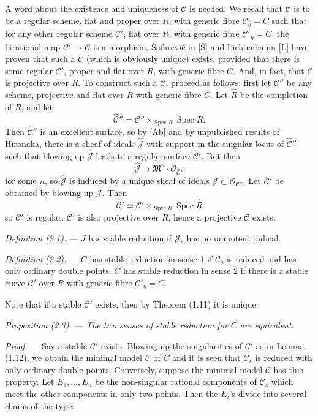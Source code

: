\documentclass[10pt]{article}
\newcommand{\Spec}{\operatorname{Spec}}
\newcommand{\cO}{\mathcal O}
\begin{document}
A word about the existence and uniqueness of $\mathscr C$ is needed. We recall that $\mathscr C$ is to be a regular scheme, flat and proper over $R$, with generic fibre $\mathscr C_\eta=C$ such that for any other regular scheme $\mathscr C'$, flat over $R$, with generic fibre $\mathscr C'_\eta=C$, the birational map $\mathscr C'\to\mathscr C$ is a morphism. \v{S}afarevi\v{c} in [\v{S}] and Lichtenbaum [L] have proven that such a $\mathscr C$ (which is obviously unique) exists, provided that there is some regular $\mathscr C'$, proper and flat over $R$, with generic fibre $C$. And, in fact, that $\mathscr C$ is projective over $R$. To construct such a $\mathscr C$, proceed as follows: first let $\mathscr C''$ be any scheme, projective and flat over $R$ with generic fibre $C$. Let $\widehat R$ be the completion of $R$, and let
\[
\widehat{\mathscr C}''=\mathscr C''\times_{\Spec R}\Spec\widehat R.
\]
Then $\widehat{\mathscr C}''$ is an excellent surface, so by [Ab] and by unpublished results of Hironaka, there is a sheaf of ideals $\widehat{\mathcal J}$ with support in the singular locus of $\widehat{\mathscr C}''$ such that blowing up $\widehat{\mathcal J}$ leads to a regular surface $\widehat{\mathscr C}'$. But then
\[
\widehat{\mathcal J}\supset \mathfrak M^n\cdot\cO_{\widehat{\mathscr C}''}
\]
for some $n$, so $\widehat{\mathcal J}$ is induced by a unique sheaf of ideals $\mathcal J\subset\cO_{\mathscr C''}$. Let $\mathscr C'$ be obtained by blowing up $\mathcal J$. Then
\[
\widehat{\mathscr C}'\simeq \mathscr C'\times_{\Spec R}\Spec\widehat R
\]
so $\mathscr C'$ is regular. $\mathscr C'$ is also projective over $R$, hence a projective $\mathscr C$ exists.


\noindent\emph{Definition (2.1).} --- $J$ has stable reduction if $\mathscr J_s$ has no unipotent radical.

\noindent\emph{Definition (2.2).} --- $C$ has stable reduction in sense 1 if $\mathscr C_s$ is reduced and has only ordinary double points. $C$ has stable reduction in sense 2 if there is a stable curve $\mathscr C'$ over $R$ with generic fibre $\mathscr C'_\eta=C$.

Note that if a stable $\mathscr C'$ exists, then by Theorem (1.11) it is unique.

\medskip
\noindent\emph{Proposition (2.3).} --- \emph{The two senses of stable reduction for $C$ are equivalent.}

\noindent\emph{Proof.} --- Say a stable $\mathscr C'$ exists. Blowing up the singularities of $\mathscr C'$ as in Lemma (1.12), we obtain the minimal model $\mathscr C$ of $C$ and it is seen that $\mathscr C_s$ is reduced with only ordinary double points. Conversely, suppose the minimal model $\mathscr C$ has this property. Let $E_1,\ldots,E_n$ be the non-singular rational components of $\mathscr C_s$ which meet the other components in only two points. Then the $E_i$'s divide into several chains of the type:
\end{document}
